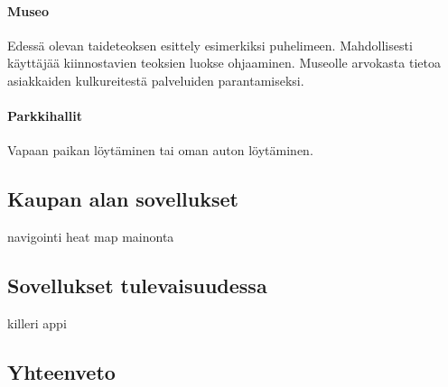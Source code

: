 \paragraph{Museo} Edessä olevan taideteoksen esittely esimerkiksi puhelimeen. Mahdollisesti käyttäjää kiinnostavien teoksien luokse ohjaaminen. Museolle arvokasta tietoa asiakkaiden kulkureitestä palveluiden parantamiseksi.
\paragraph{Parkkihallit} Vapaan paikan löytäminen tai oman auton löytäminen\cite{lips}.


\subsection{Kaupan alan sovellukset}
navigointi
heat map
mainonta
\subsection{Sovellukset tulevaisuudessa}
killeri appi
\subsection{Yhteenveto}

